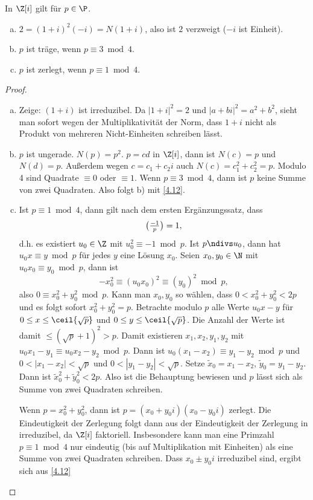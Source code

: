 \begin{st} \label{4.13}
	In $\Z[i]$ gilt für $p \in \P$.
	\begin{enumerate}[a)]
		\item
			$2 = (1 + i)^2 (-i) = N(1 + i)$, also ist $2$ verzweigt ($-i$ ist Einheit).
		\item
			$p$ ist träge, wenn $p \equiv 3 \bmod 4$.
		\item
			$p$ ist zerlegt, wenn $p \equiv 1 \bmod 4$.
	\end{enumerate}
	\begin{proof}
		\begin{enumerate}[a)]
			\item
				Zeige: $(1 + i)$ ist irreduzibel.
				Da $|1+i|^2 = 2$ und $|a + bi|^2 = a^2 + b^2$, sieht man sofort wegen der Multiplikativität der Norm, dass $1 + i$ nicht als Produkt von mehreren Nicht-Einheiten schreiben lässt.
			\item
				$p$ ist ungerade.
				$N(p) = p^2$.
				$p = cd$ in $\Z[i]$, dann ist $N(c) = p$ und $N(d) = p$.
				Außerdem wegen $c = c_1 + c_2 i$ auch $N(c) = c_1^2 + c_2^2 = p$.
				Modulo 4 sind Quadrate $\equiv 0$ oder $\equiv 1$.
				Wenn $p \equiv 3 \bmod 4$, dann ist $p$ keine Summe von zwei Quadraten.
				Also folgt b) mit \ref{4.12}.
			\item
				Ist $p \equiv 1 \bmod 4$, dann gilt nach dem ersten Ergänzungssatz, dass
				\[
					\legsym{-1}{p} = 1,
				\]
				d.h. es existiert $u_0 \in \Z$ mit $u_0^2 \equiv -1 \bmod p$.
				Ist $p \ndivs u_0$, dann hat $u_0 x \equiv y \bmod p$ für jedes $y$ eine Lösung $x_0$.
				Seien $x_0, y_0 \in \N$ mit $u_0 x_0 \equiv y_0 \bmod p$, dann ist
				\[
					-x_0^2 \equiv (u_0 x_0)^2 \equiv (y_0)^2 \bmod p,
				\]
				also $0 \equiv x_0^2 + y_0^2 \bmod p$.
				Kann man $x_0, y_0$ so wählen, dass $0 < x_0^2 + y_0^2 < 2p$ und es folgt sofort $x_0^2 + y_0^2 = p$.
				Betrachte modulo $p$ alle Werte $u_0 x - y$ für $0 \le x \le \ceil{\sqrt{p}}$ und $0 \le y \le \ceil{\sqrt p}$.
				Die Anzahl der Werte ist damit $\le (\sqrt{p} + 1)^2 > p$.
				Damit existieren $x_1, x_2, y_1, y_2$ mit $u_0 x_1 - y_1 \equiv u_0 x_2 - y_2 \bmod p$.
				Dann ist $u_0 (x_1 - x_2) \equiv y_1 - y_2 \bmod p$ und $0 < |x_1 - x_2| < \sqrt p$ und $0 < |y_1 - y_2| < \sqrt p$.
				Setze $\tilde x_0 = x_1 - x_2$, $\tilde y_0 = y_1 - y_2$.
				Dann ist $\tilde x_0^2 + \tilde y_0^2 < 2p$.
				Also ist die Behauptung bewiesen und $p$ lässt sich als Summe von zwei Quadraten schreiben.

				Wenn $p = x_0^2 + y_0^2$, dann ist $p = (x_0 + y_0 i)(x_0 - y_0 i)$ zerlegt.
				Die Eindeutigkeit der Zerlegung folgt dann aus der Eindeutigkeit der Zerlegung in irreduzibel, da $\Z[i]$ faktoriell.
				Insbesondere kann man eine Primzahl $p \equiv 1 \bmod 4$ nur eindeutig (bis auf Multiplikation mit Einheiten) als eine Summe von zwei Quadraten schreiben.
				Dass $x_0 \pm y_0 i$ irreduzibel sind, ergibt sich aus \ref{4.12}
		\end{enumerate}
	\end{proof}
\end{st}

